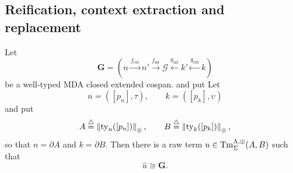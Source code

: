 \subsection{Reification, context extraction and replacement}

\begin{lemma}[Reification]
\label{lemma:lambda-reification}
Let
\[
 \mathbf G
 =
 \left(
 n
 \xrightarrow{f_{\mathrm{ext}}}
 n'
 \xrightarrow{f_{\mathrm{int}}}
 \mathcal G
 \xleftarrow{g_{\mathrm{int}}}
 k'
 \xleftarrow{g_{\mathrm{ext}}}
 k
 \right)
\]
be a well-typed MDA closed extended cospan. and put
Let
\[
n = ([p_n], \tau), \qquad k = ([p_k], \upsilon)
\]
and put
\[
 A\stackrel{\triangle}{=}\left\lVert\operatorname{ty}_{n}([p_n])\right\rVert_{\otimes},
 \qquad
 B\stackrel{\triangle}{=}\left\lVert\operatorname{ty}_{k}([p_k])\right\rVert_{\otimes},
\]
so that $n=\partial A$ and $k=\partial B$.  Then there is a raw term
$u\in\operatorname{Tm}^{\Lambda,\operatorname{\oplus}}_{\Sigma}(A,B)$ such that
\[
 \widehat u\cong\mathbf G.
\]
\end{lemma}
